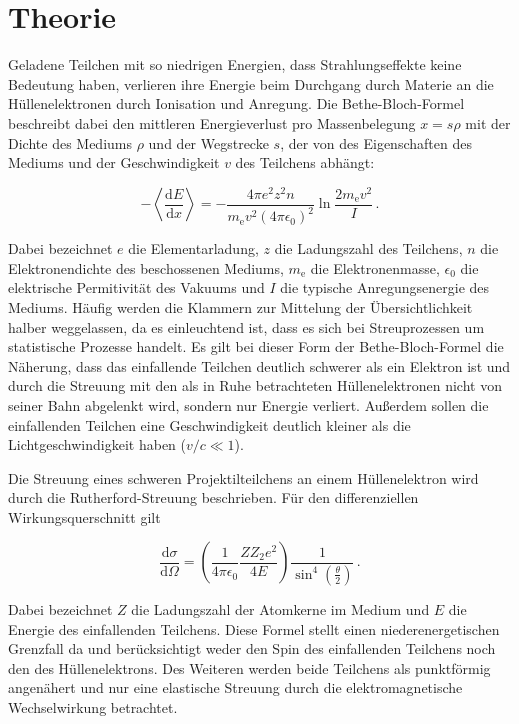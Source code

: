 \section{Theorie}
\label{sec:Theorie}

Geladene Teilchen mit so niedrigen Energien, dass Strahlungseffekte keine Bedeutung haben, verlieren ihre Energie beim Durchgang durch Materie an die Hüllenelektronen durch Ionisation und Anregung. Die Bethe-Bloch-Formel beschreibt dabei den mittleren Energieverlust pro Massenbelegung $x = s \rho$ mit der Dichte des Mediums $\rho$ und der Wegstrecke $s$, der von des Eigenschaften des Mediums und der Geschwindigkeit $v$ des Teilchens abhängt:

\begin{equation}
  -\left<\frac{\mathrm{d}E}{\mathrm{d}x}\right> = - \frac{4\pi e^2 z^2 n}{m_{\mathrm{e}}v^2(4 \pi \epsilon_{\mathrm{0}})^2} \ln{\frac{2 m_{\mathrm{e}} v^2}{I}}\,.
  \label{eqn:bethe}
\end{equation}

Dabei bezeichnet $e$ die Elementarladung, $z$ die Ladungszahl des Teilchens, $n$ die Elektronendichte des beschossenen Mediums, $m_\text{e}$ die Elektronenmasse, $\epsilon_0$ die elektrische Permitivität des Vakuums und $I$ die typische Anregungsenergie des Mediums. Häufig werden die Klammern zur Mittelung der Übersichtlichkeit halber weggelassen, da es einleuchtend ist, dass es sich bei Streuprozessen um statistische Prozesse handelt.
Es gilt bei dieser Form der Bethe-Bloch-Formel die Näherung, dass das einfallende Teilchen deutlich schwerer als ein Elektron ist und durch die Streuung mit den als in Ruhe betrachteten Hüllenelektronen nicht von seiner Bahn abgelenkt wird, sondern nur Energie verliert. Außerdem sollen die einfallenden Teilchen eine Geschwindigkeit deutlich kleiner als die Lichtgeschwindigkeit haben ($v/c \ll 1$).

Die Streuung eines schweren Projektilteilchens an einem Hüllenelektron wird durch die Rutherford-Streuung beschrieben. Für den differenziellen Wirkungsquerschnitt gilt

\begin{equation}
  \frac{\mathrm{d}\sigma}{\mathrm{d}\Omega} = \left( \frac{1}{4\pi\epsilon_0}\frac{Z Z_2 e^2}{4 E} \right) \frac{1}{\sin^4\left( \frac{\theta}{2} \right)}\,.
  \label{eqn:rutherford}
\end{equation}

Dabei bezeichnet $Z$ die Ladungszahl der Atomkerne im Medium und $E$ die Energie des einfallenden Teilchens.
Diese Formel stellt einen niederenergetischen Grenzfall da und berücksichtigt weder den Spin des einfallenden Teilchens noch den des Hüllenelektrons. Des Weiteren werden beide Teilchens als punktförmig angenähert und nur eine elastische Streuung durch die elektromagnetische Wechselwirkung betrachtet.

